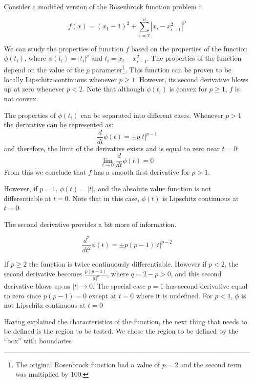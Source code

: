 Consider a modified version of the Rosenbrock function problem \citep{rosenbrock}:

\begin{equation} \label{modifiedrosenbrock}
    f(x) = (x_1 - 1)^2 + \sum_{i = 2}^n |x_i - x_{i - 1}^2|^p
\end{equation}

We can study the properties of function $f$ based on the properties of the function $\phi(t_i)$, where $\phi(t_i) = |t_i|^p$ and $t_i = x_i - x_{i - 1}^2$. The properties of the function depend on the value of the $p$ parameter\footnote{The original Rosenbrock function had a value of $p = 2$ and the second term was multiplied by $100$.}. This function can be proven to be locally Lipschitz continuous whenever $p \geq 1$. However, its second derivative blows up at zero whenever $p < 2$. Note that although $\phi(t_i)$ is convex for $p \geq 1$, $f$ is not convex.

The properties of $\phi(t_i)$ can be separated into different cases. Whenever $p > 1$ the derivative can be represented as:
\begin{equation}\label{firstderiv}
  \frac{d}{dt} \phi(t) = \pm p |t|^{p-1}
\end{equation}
and therefore, the limit of the derivative exists and is equal to zero near $t = 0$: \[ \lim_{t \to 0} \frac{d}{dt}\phi(t) = 0 \] From this we conclude that $f$ has a smooth first derivative for $p > 1$.

However, if $p = 1$, $\phi(t) = |t|$, and the absolute value function is not differentiable at $t = 0$. Note that in this case, $\phi(t)$ is Lipschitz continuous at $t = 0$.

The second derivative provides a bit more of information.

\begin{equation}\label{secondderiv}
  \frac{d^2}{dt^2} \phi(t) = \pm p(p-1) |t|^{p-2}
\end{equation}

If $p \geq 2$ the function is twice continuously differentiable. However if $p < 2$, the second derivative becomes $\frac{p(p-1)}{|t|^{q}}$, where $q = 2 - p > 0$, and this second derivative blows up as $|t| \to 0$. The special case $p = 1$ has second derivative equal to zero since $p(p-1) = 0$ except at $t = 0$ where it is undefined. For $p < 1$, $\phi$ is not Lipschitz continuous at $t = 0$

Having explained the characteristics of the function, the next thing that needs to be defined is the region to be tested. We chose the region to be defined by the ``box'' with boundaries

